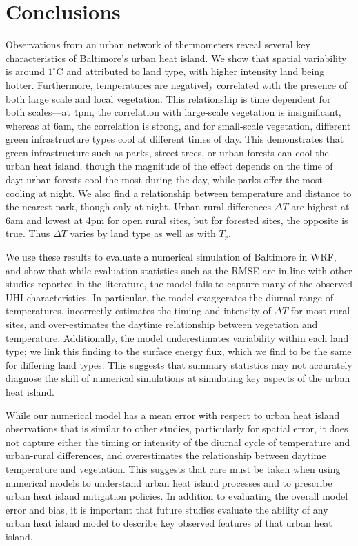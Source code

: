 \documentclass[draft,linenumbers]{agujournal}
\begin{document}
\section{Conclusions}\label{sec:conclusions}
Observations from an urban network of thermometers reveal several key characteristics of Baltimore's urban heat island. We show that spatial variability is around $1^\circ$C and attributed to land type, with higher intensity land being hotter. 
Furthermore, temperatures are negatively correlated with the presence of both large scale and local vegetation. This relationship is time dependent for both scales---at 4pm, the correlation with large-scale vegetation is insignificant, whereas at 6am, the correlation is strong, and for small-scale vegetation, different green infrastructure types cool at different times of day.  
This demonstrates that green infrastructure such as parks, street trees, or urban forests can cool the urban heat island, though the magnitude of the effect depends on the time of day: urban forests cool the most during the day, while parks offer the most cooling at night. 
We also find a relationship between temperature and distance to the nearest park, though only at night.
 Urban-rural differences $\Delta T$ are highest at 6am and lowest at 4pm for open rural sites, but for forested sites, the opposite is true. Thus $\Delta T$ varies by land type as well as with $T_r$.

 We use these results to evaluate a numerical simulation of Baltimore in WRF, and show that while evaluation statistics such as the RMSE are in line with other studies reported in the literature, the model fails to capture many of the observed UHI characteristics. In particular, the model exaggerates the diurnal range of temperatures, incorrectly estimates the timing and intensity of $\Delta T$ for most rural sites, and over-estimates the daytime relationship between vegetation and temperature. 
 Additionally, the model underestimates variability within each land type;%
 we link this finding to the surface energy flux, which we find to be the same for differing land types. This suggests that summary statistics may not accurately diagnose the skill of numerical simulations at simulating key aspects of the urban heat island. 

While our numerical model has a mean error with respect to urban heat island observations that is similar to other studies, particularly for spatial error, it does not capture either the timing or intensity of the diurnal cycle of temperature and urban-rural differences, and overestimates the relationship between daytime temperature and vegetation. This suggests that care must be taken when using numerical models to understand urban heat island processes and to prescribe urban heat island mitigation policies. 
In addition to evaluating the overall model error and bias, it is important that future studies evaluate the ability of any urban heat island model to describe key observed features of that urban heat island. 
\end{document}
